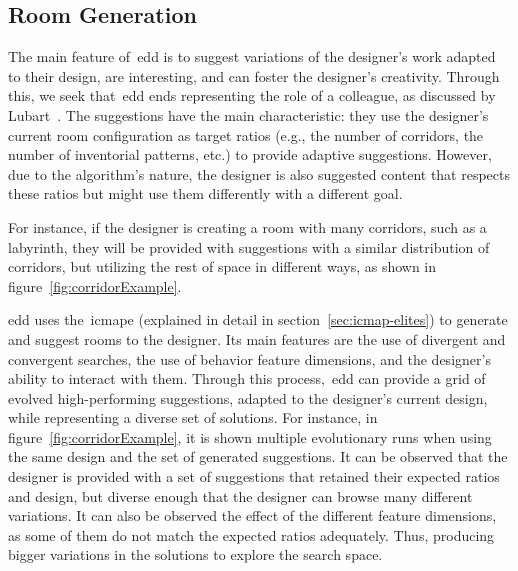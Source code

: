
\subsection{Room Generation}

The main feature of~\acrshort{edd} is to suggest variations of the designer's work adapted to their design, are interesting, and can foster the designer's creativity. Through this, we seek that~\acrshort{edd} ends representing the role of a colleague, as discussed by Lubart~\cite{lubart_how_2005}. The suggestions have the main characteristic: they use the designer's current room configuration as target ratios (e.g., the number of corridors, the number of inventorial patterns, etc.) to provide adaptive suggestions. However, due to the algorithm's nature, the designer is also suggested content that respects these ratios but might use them differently with a different goal.

For instance, if the designer is creating a room with many corridors, such as a labyrinth, they will be provided with suggestions with a similar distribution of corridors, but utilizing the rest of space in different ways, as shown in figure~\ref{fig:corridorExample}.

\acrshort{edd} uses the~\acrshort{icmape} (explained in detail in section~\ref{sec:icmap-elites}) to generate and suggest rooms to the designer. Its main features are the use of divergent and convergent searches, the use of behavior feature dimensions, and the designer's ability to interact with them. Through this process,~\acrshort{edd} can provide a grid of evolved high-performing suggestions, adapted to the designer's current design, while representing a diverse set of solutions. For instance, in figure~\ref{fig:corridorExample}, it is shown multiple evolutionary runs when using the same design and the set of generated suggestions. It can be observed that the designer is provided with a set of suggestions that retained their expected ratios and design, but diverse enough that the designer can browse many different variations. It can also be observed the effect of the different feature dimensions, as some of them do not match the expected ratios adequately. Thus, producing bigger variations in the solutions to explore the search space. 


